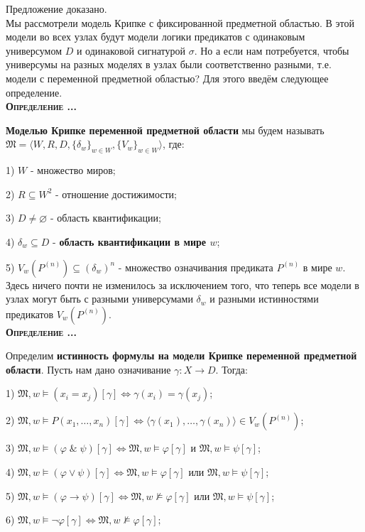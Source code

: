 \documentclass[18pt, a4paper]{extarticle}
\newcounter{par}
\newcounter{spar}
\newcounter{zap}
\newcommand{\opr}{\textbf{\textsc{Определение \thepar.\if\thespar1\thespar.\fi\thezap.\;}}\stepcounter{zap}}
\newcommand{\mM}{\mathfrak{M}}
\newcommand{\ampersand}{\;\&\;}
\newcommand{\vp}{\varphi}
\newcommand{\vD}{\vDash}
\newcommand{\sg}{\sigma}
\newcommand{\lot}[3]{#1_#2,\dots,#1_#3}
\begin{document}
Предложение доказано.\\

Мы рассмотрели модель Крипке с фиксированной предметной областью. В этой модели во всех узлах будут модели логики предикатов с одинаковым универсумом $D$ и одинаковой сигнатурой $\sg$. Но а если нам потребуется, чтобы универсумы на разных моделях в узлах были соответственно разными, т.е. модели с переменной предметной областью? Для этого введём следующее определение.\\

\opr

\textbf{Моделью Крипке переменной предметной области} мы будем называть $\mM=\langle W,R,D,\{\delta_w\}_{w\in W},\{V_w\}_{w\in W}\rangle$, где:

1) $W$ - множество миров;

2) $R\subseteq W^2$ - отношение достижимости;

3) $D\neq\varnothing$ - область квантификации;

4) $\delta_w\subseteq D$ - \textbf{область квантификации в мире $w$}; 

5) $V_w(P^{(n)})\subseteq (\delta_w)^n$ - множество означивания предиката $P^{(n)}$ в мире $w$.\\

Здесь ничего почти не изменилось за исключением того, что теперь все модели в узлах могут быть с разными универсумами $\delta_w$ и разными истинностями предикатов $V_w(P^{(n)})$. \\

\opr

Определим \textbf{истинность формулы на модели Крипке переменной предметной области}. Пусть нам дано означивание $\gamma\!:X\to D$. Тогда:

1) $\mM,w\vD(x_i=x_j)[\gamma]\Leftrightarrow\gamma(x_i)=\gamma(x_j)$;

2) $\mM,w\vD P(\lot x 1 n)[\gamma]\Leftrightarrow\langle\gamma(x_1),\dots,\gamma(x_n)\rangle\in V_w(P^{(n)})$;

3) $\mM,w\vD(\vp\ampersand\psi)[\gamma]\Leftrightarrow\mM,w\vD\vp[\gamma]$ и $\mM,w\vD\psi[\gamma]$;

4) $\mM,w\vD(\vp\vee\psi)[\gamma]\Leftrightarrow\mM,w\vD\vp[\gamma]$ или $\mM,w\vD\psi[\gamma]$;

5) $\mM,w\vD(\vp\to\psi)[\gamma]\Leftrightarrow\mM,w\nvDash\vp[\gamma]$ или $\mM,w\vD\psi[\gamma]$;

6) $\mM,w\vD\lnot\vp[\gamma]\Leftrightarrow\mM,w\nvDash\vp[\gamma]$;
\end{document}
